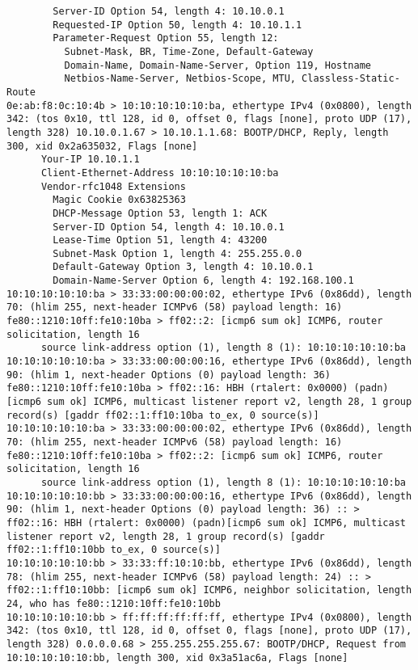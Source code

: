 \documentclass[a4paper,12pt]{article}
\begin{document}
\begin{Verbatim}
	    Server-ID Option 54, length 4: 10.10.0.1
	    Requested-IP Option 50, length 4: 10.10.1.1
	    Parameter-Request Option 55, length 12: 
	      Subnet-Mask, BR, Time-Zone, Default-Gateway
	      Domain-Name, Domain-Name-Server, Option 119, Hostname
	      Netbios-Name-Server, Netbios-Scope, MTU, Classless-Static-Route
0e:ab:f8:0c:10:4b > 10:10:10:10:10:ba, ethertype IPv4 (0x0800), length 342: (tos 0x10, ttl 128, id 0, offset 0, flags [none], proto UDP (17), length 328) 10.10.0.1.67 > 10.10.1.1.68: BOOTP/DHCP, Reply, length 300, xid 0x2a635032, Flags [none]
	  Your-IP 10.10.1.1
	  Client-Ethernet-Address 10:10:10:10:10:ba
	  Vendor-rfc1048 Extensions
	    Magic Cookie 0x63825363
	    DHCP-Message Option 53, length 1: ACK
	    Server-ID Option 54, length 4: 10.10.0.1
	    Lease-Time Option 51, length 4: 43200
	    Subnet-Mask Option 1, length 4: 255.255.0.0
	    Default-Gateway Option 3, length 4: 10.10.0.1
	    Domain-Name-Server Option 6, length 4: 192.168.100.1
10:10:10:10:10:ba > 33:33:00:00:00:02, ethertype IPv6 (0x86dd), length 70: (hlim 255, next-header ICMPv6 (58) payload length: 16) fe80::1210:10ff:fe10:10ba > ff02::2: [icmp6 sum ok] ICMP6, router solicitation, length 16
	  source link-address option (1), length 8 (1): 10:10:10:10:10:ba
10:10:10:10:10:ba > 33:33:00:00:00:16, ethertype IPv6 (0x86dd), length 90: (hlim 1, next-header Options (0) payload length: 36) fe80::1210:10ff:fe10:10ba > ff02::16: HBH (rtalert: 0x0000) (padn)[icmp6 sum ok] ICMP6, multicast listener report v2, length 28, 1 group record(s) [gaddr ff02::1:ff10:10ba to_ex, 0 source(s)]
10:10:10:10:10:ba > 33:33:00:00:00:02, ethertype IPv6 (0x86dd), length 70: (hlim 255, next-header ICMPv6 (58) payload length: 16) fe80::1210:10ff:fe10:10ba > ff02::2: [icmp6 sum ok] ICMP6, router solicitation, length 16
	  source link-address option (1), length 8 (1): 10:10:10:10:10:ba
10:10:10:10:10:bb > 33:33:00:00:00:16, ethertype IPv6 (0x86dd), length 90: (hlim 1, next-header Options (0) payload length: 36) :: > ff02::16: HBH (rtalert: 0x0000) (padn)[icmp6 sum ok] ICMP6, multicast listener report v2, length 28, 1 group record(s) [gaddr ff02::1:ff10:10bb to_ex, 0 source(s)]
10:10:10:10:10:bb > 33:33:ff:10:10:bb, ethertype IPv6 (0x86dd), length 78: (hlim 255, next-header ICMPv6 (58) payload length: 24) :: > ff02::1:ff10:10bb: [icmp6 sum ok] ICMP6, neighbor solicitation, length 24, who has fe80::1210:10ff:fe10:10bb
10:10:10:10:10:bb > ff:ff:ff:ff:ff:ff, ethertype IPv4 (0x0800), length 342: (tos 0x10, ttl 128, id 0, offset 0, flags [none], proto UDP (17), length 328) 0.0.0.0.68 > 255.255.255.255.67: BOOTP/DHCP, Request from 10:10:10:10:10:bb, length 300, xid 0x3a51ac6a, Flags [none]

\end{Verbatim}
\end{document}
